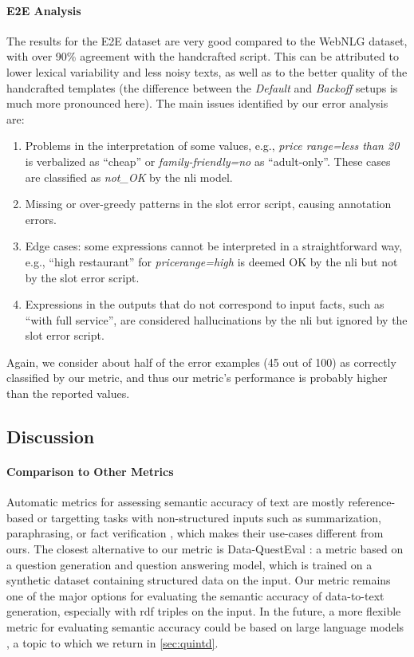 \paragraph{E2E Analysis} The results for the E2E dataset are very good compared to the WebNLG dataset, with over 90\% agreement with the handcrafted script. This can be attributed to lower lexical variability and less noisy texts, as well as to the better quality of the handcrafted templates (the difference between the \emph{Default} and \emph{Backoff} setups is much more pronounced here). The main issues identified by our error analysis are:
\begin{enumerate}
    \item Problems in the interpretation of some values, e.g., \textit{price range=less than \textsterling{}20} is verbalized as ``cheap'' or \textit{family-friendly=no} as ``adult-only''. These cases are classified as \emph{not\_OK} by the \ac{nli} model.
    \item Missing or over-greedy patterns in the slot error script, causing annotation errors.
    \item Edge cases: some expressions cannot be interpreted in a straightforward way, e.g., ``high restaurant'' for \emph{pricerange=high} is deemed OK by the \ac{nli} but not by the slot error script.
    \item Expressions in the outputs that do not correspond to input facts, such as ``with full service'', are considered hallucinations by the \ac{nli} but ignored by the slot error script.
\end{enumerate}
Again, we consider about half of the error examples (45 out of 100) as correctly classified by our metric, and thus our metric's performance is probably higher than the reported values.

\subsection{Discussion}

\paragraph{Comparison to Other Metrics} Automatic metrics for assessing semantic accuracy of text are mostly reference-based \cite{zhaoMoverScoreTextGeneration2019,dhingraHandlingDivergentReference2019,sellam2020bleurt,ronyRoMeRobustMetric2022} or targetting tasks with non-structured inputs such as summarization, paraphrasing, or fact verification \cite{honovich2022true,zha2023alignscore}, which makes their use-cases different from ours. The closest alternative to our metric is Data-QuestEval \cite{rebuffel2021data}: a metric based on a question generation and question answering model, which is trained on a synthetic dataset containing structured data on the input. Our metric remains one of the major options for evaluating the semantic accuracy of data-to-text generation, especially with \ac{rdf} triples on the input. In the future, a more flexible metric for evaluating semantic accuracy could be based on large language models \cite{zhaoInvestigatingTabletoTextGeneration2023,sottanaEvaluationMetricsEra2023,kocmiLargeLanguageModels2023}, a topic to which we return in \autoref{sec:quintd}.

